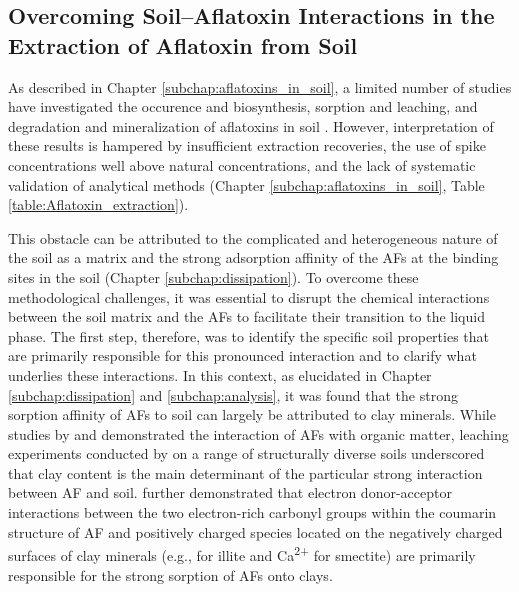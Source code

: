 \subsection{Overcoming Soil--Aflatoxin Interactions in the Extraction of Aflatoxin from Soil} 

As described in Chapter \ref{subchap:aflatoxins_in_soil}, a limited number of studies have investigated the occurence and biosynthesis, sorption and leaching, and degradation and mineralization of aflatoxins in soil \citep{accinelli2008aspergillus, goldberg1985aflatoxin, angle1980decomposition, angle1986aflatoxin}. However, interpretation of these results is hampered by insufficient extraction recoveries, the use of spike concentrations well above natural concentrations, and the lack of systematic validation of analytical methods (Chapter \ref{subchap:aflatoxins_in_soil}, Table \ref{table:Aflatoxin_extraction}). 


This obstacle can be attributed to the complicated and heterogeneous nature of the soil as a matrix and the strong adsorption affinity of the AFs at the binding sites in the soil (Chapter \ref{subchap:dissipation}). To overcome these methodological challenges, it was essential to disrupt the chemical interactions between the soil matrix and the AFs to facilitate their transition to the liquid phase. The first step, therefore, was to identify the specific soil properties that are primarily responsible for this pronounced interaction and to clarify what underlies these interactions. In this context, as elucidated in Chapter \ref{subchap:dissipation} and \ref{subchap:analysis}, it was found that the strong sorption affinity of AFs to soil can largely be attributed to clay minerals.  While studies by \citet{schenzel2012experimentally} and \citet{van2006vitro} demonstrated the interaction of AFs with organic matter, leaching experiments conducted by \citet{goldberg1985aflatoxin} on a range of structurally diverse soils underscored that clay content is the main determinant of the particular strong interaction between AF and soil. \citet{kang2016understanding} further demonstrated that electron donor-acceptor interactions between the two electron-rich carbonyl groups within the coumarin structure of AF and positively charged species located on the negatively charged surfaces of clay minerals (e.g.,  for illite and Ca\textsuperscript{2+} for smectite) are primarily responsible for the strong sorption of AFs onto clays. 


